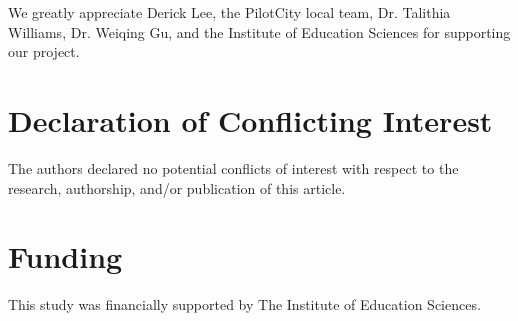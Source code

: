 \documentclass[fleqn,10pt]{JLA_article} %
\begin{document}
We greatly appreciate Derick Lee, the PilotCity local team, Dr. Talithia Williams, Dr. Weiqing Gu, and the Institute of Education Sciences for supporting our project.

\section*{Declaration of Conflicting Interest} %


The authors declared no potential conflicts of interest with respect to the research, authorship, and/or publication of this article.

\section*{Funding} %


This study was financially supported by The Institute of Education Sciences.


\nocite{*}

\end{document}
